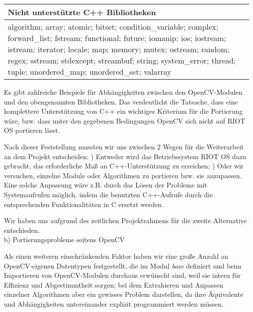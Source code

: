 \documentclass[10pt,a4paper]{article}
\begin{document}
\begin{center}
  \begin{tabular}{ | p{10cm} | }
    \hline
    Nicht unterstützte C++ Bibliotheken \\ \hline

algorithm; array; atomic; bitset; condition\_variable; complex; \newline
forward\_list; fstream; functional; future; iomanip; ios; iostream; \newline 
istream; iterator; locale; map; memory; mutex; ostream; random; \newline
regex; sstream; stdexcept; streambuf; string; system\_error; \newline
thread; tuple; unordered\_map; unordered\_set; valarray \\

    \hline
  \end{tabular}
\end{center}

Es gibt zahlreiche Beispiele für Abhängigkeiten zwischen den OpenCV-Modulen und den obengenannten Bibliotheken. Das verdeutlicht die Tatsache, dass eine komplettere Unterstützung von C++ ein wichtiges Kriterium für die Portierung wäre, bzw. dass unter den gegebenen Bedingungen OpenCV sich nicht auf RIOT OS portieren lässt. \newline

Nach dieser Feststellung mussten wir uns zwischen 2 Wegen für die Weiterarbeit an dem Projekt entscheiden: ) Entweder wird das Betriebssystem RIOT OS dazu gebracht, das erforderliche Maß an C++-Unterstützung zu erreichen; ) Oder wir versuchen, einzelne Module oder Algorithmen zu portieren bzw. sie anzupassen. Eine solche Anpassung wäre z.B. durch das Lösen der Probleme mit Systemaufrufen möglich, indem die benutzten C++-Aufrufe durch die entsprechenden Funktionalitäten in C ersetzt werden.\newline

Wir haben uns aufgrund des zeitlichen Projektrahmens für die zweite Alternative entschieden. \\

b) Portierungsprobleme seitens OpenCV \newline

Als einen weiteren einschränkenden Faktor haben wir eine große Anzahl an OpenCV-eigenen Datentypen festgestellt, die im Modul {\it base} definiert und beim Importieren von OpenCV-Modulen durchaus erwünscht sind, weil sie intern für Effizienz und Abgestimmtheit sorgen; bei dem Extrahieren und Anpassen einzelner Algorithmen aber ein gewisses Problem darstellen, da ihre Äquivalente und Abhängigkeiten untereinander explizit programmiert werden müssen.
\end{document}
